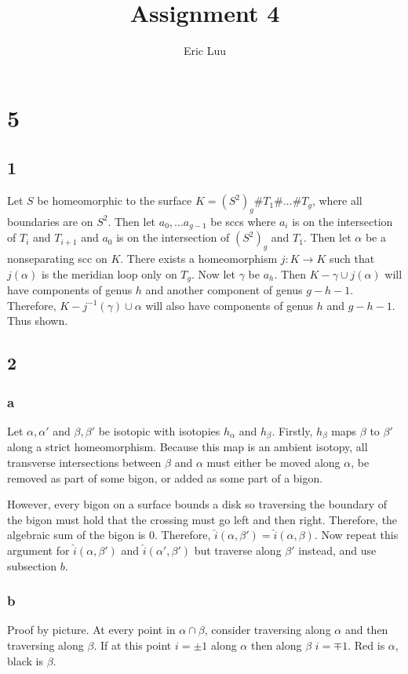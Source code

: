 \documentclass{article}
\title{Assignment 4}
\author{Eric Luu}
\theoremstyle{definition}
\numberwithin{theorem}{section}
\numberwithin{equation}{section}
\newcommand*{\inter}{\hat{i}}
\begin{document}
\section{5}
\subsection{1}
Let $S$ be homeomorphic to the surface $K = (S^2)_g \# T_1 \# ... \# T_g$, where all boundaries are on $S^2$. Then let $a_0, ... a_{g-1}$ be sccs where $a_i$ is on the intersection of $T_{i}$ and $T_{i + 1}$ and $a_0$ is on the intersection of $(S^2)_g$ and $T_1$. Then let $\alpha$ be a nonseparating scc on $K$. There exists a homeomorphism $j : K \rightarrow K$ such that $j(\alpha)$ is the meridian loop only on $T_g$. Now let $\gamma$ be $a_h$. Then $K - \gamma \cup j(\alpha)$ will have components of genus $h$ and another component of genus $g - h - 1$. Therefore, $K - j^{-1}(\gamma) \cup \alpha$ will also have components of genus $h$ and $g - h - 1$. Thus shown. 
\subsection{2}
\subsubsection{a}
Let $\alpha, \alpha'$ and $\beta, \beta'$ be isotopic with isotopies $h_\alpha$ and $h_\beta$. Firstly, $h_\beta$ maps $\beta$ to $\beta'$ along a strict homeomorphism. Because this map is an ambient isotopy, all transverse intersections between $\beta$ and $\alpha$ must either be moved along $\alpha$, be removed as part of some bigon, or added as some part of a bigon. 

However, every bigon on a surface bounds a disk so traversing the boundary of the bigon must hold that the crossing must go left and then right. Therefore, the algebraic sum of the bigon is $0$. 
Therefore, $\inter(\alpha, \beta') =  \inter(\alpha, \beta)$. Now repeat this argument for $\inter(\alpha, \beta')$ and $\inter(\alpha', \beta')$ but traverse along $\beta'$ instead, and use subsection $b$. 

\subsubsection{b}
Proof by picture. At every point in $\alpha \cap \beta$, consider traversing along $\alpha$ and then traversing along $\beta$. If at this point $i = \pm 1$ along $\alpha$ then along $\beta$ $i = \mp 1$. Red is $\alpha$, black is $\beta$. 
\end{document}
